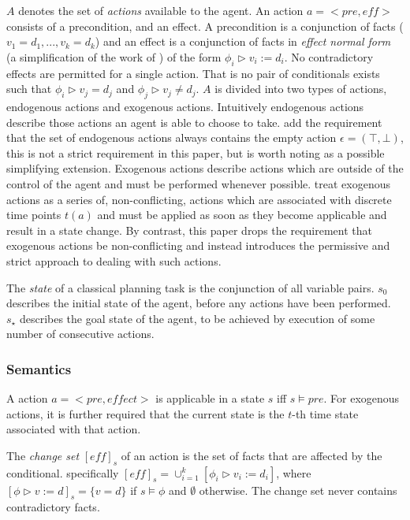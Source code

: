 \documentclass{article}
\theoremstyle{plain}
\theoremstyle{definition}
\begin{document}
$A$ denotes the set of \textit{actions} available to the agent. An action $a=<pre,eff>$ consists of a precondition, and an effect. A precondition is a conjunction of facts ($v_1=d_1,...,v_k=d_k$) and an effect is a conjunction of facts in \textit{effect normal form} (a simplification of the work of \citet{rintanen2003expressive}) of the form $\phi_i \triangleright v_i:=d_i$. No contradictory effects are permitted for a single action. That is no pair of conditionals exists such that $\phi_i \triangleright v_j=d_j$ and $\phi_j \triangleright v_j \neq d_j$. $A$ is divided into two types of actions, endogenous actions and exogenous actions. Intuitively endogenous actions describe those actions an agent is able to choose to take. \citet{lind2019ethical} add the requirement that the set of endogenous actions always contains the empty action $\epsilon=(\top,\bot)$, this is not a strict requirement in this paper, but is worth noting as a possible simplifying extension. Exogenous actions describe actions which are outside of the control of the agent and must be performed whenever possible. \citet{lind2019ethical} treat exogenous actions as a series of, non-conflicting, actions which are associated with discrete time points $t(a)$ and must be applied as soon as they become applicable and result in a state change. By contrast, this paper drops the requirement that exogenous actions be non-conflicting and instead introduces the permissive and strict approach to dealing with such actions.

The \textit{state} of a classical planning task is the conjunction of all variable pairs. $s_0$ describes the initial state of the agent, before any actions have been performed. $s_\star$ describes the goal state of the agent, to be achieved by execution of some number of consecutive actions.

\subsubsection*{Semantics}
A action $a=<pre, effect>$ is applicable in a state $s$ iff $s\models pre$. For exogenous actions, it is further required that the current state is the $t$-th time state associated with that action. 

The \textit{change set} $[eff]_s$ of an action is the set of facts that are affected by the conditional. specifically $[eff]_s=\cup^k_{i=1}[\phi_i \triangleright v_i:=d_i]$, where $[\phi \triangleright v:=d]_s=\{v=d\}$ if $s \models \phi$ and $\emptyset$ otherwise. The change set never contains contradictory facts.
\end{document}
